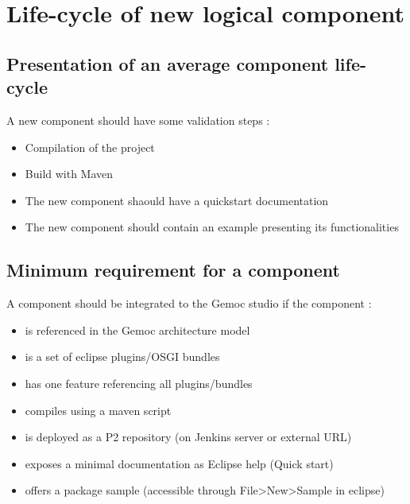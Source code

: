 \documentclass{gemoc} %
\begin{document}
\section{Life-cycle of new logical component}
\subsection{Presentation of an average component life-cycle}
A new component should have some validation steps :
\begin{itemize}
	\item Compilation of the project
	\item Build with Maven
	\item The new component shaould have a quickstart documentation
	\item The new component should contain an example presenting its functionalities
\end{itemize}
\subsection{Minimum requirement for a component}
A component should be integrated to the Gemoc studio if the component : 
\newline
\begin{itemize}
	\item is referenced in the Gemoc architecture model
	\item is a set of eclipse plugins/OSGI bundles
	\item has one feature referencing all plugins/bundles
	\item compiles using a maven script
	\item is deployed as a P2 repository (on Jenkins server or external URL)
	\item exposes a minimal documentation as Eclipse help (Quick start)
	\item offers a package sample (accessible through File>New>Sample in eclipse)
\end{itemize}

\end{document}
